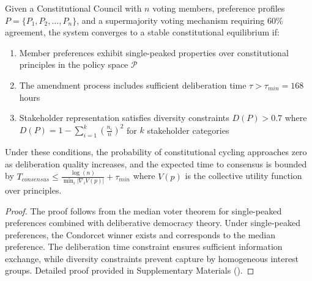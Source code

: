 \documentclass[manuscript,screen,9pt]{acmart}
\begin{document}
\begin{theorem}
	\label{thm:democratic_convergence}
	Given a Constitutional Council with $n$ voting members, preference profiles $P = \{P_1, P_2, \ldots, P_n\}$, and a supermajority voting mechanism requiring 60\% agreement, the system converges to a stable constitutional equilibrium if:
	\begin{enumerate}[itemsep=1pt,parsep=1pt]
		\item Member preferences exhibit single-peaked properties over constitutional principles in the policy space $\mathcal{P}$
		\item The amendment process includes sufficient deliberation time $\tau > \tau_{min} = 168$ hours
		\item Stakeholder representation satisfies diversity constraints $D(P) > 0.7$ where $D(P) = 1 - \sum_{i=1}^{k} (\frac{n_i}{n})^2$ for $k$ stakeholder categories
	\end{enumerate}
	Under these conditions, the probability of constitutional cycling approaches zero as deliberation quality increases, and the expected time to consensus is bounded by $T_{consensus} \leq \frac{\log(n)}{\min_i |\nabla_i V(p)|} + \tau_{min}$ where $V(p)$ is the collective utility function over principles.
\end{theorem}
\begin{proof}
	The proof follows from the median voter theorem for single-peaked preferences combined with deliberative democracy theory. Under single-peaked preferences, the Condorcet winner exists and corresponds to the median preference. The deliberation time constraint ensures sufficient information exchange, while diversity constraints prevent capture by homogeneous interest groups. Detailed proof provided in Supplementary Materials ().
\end{proof}
\end{document}
